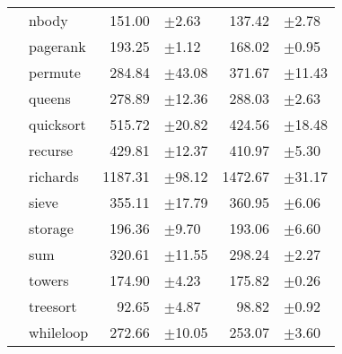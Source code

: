 \begin{tabular}{ll@{\hspace{6pt}}r@{\hspace{3pt}}l@{\hspace{6pt}}r@{\hspace{3pt}}l}
 & nbody & 151.00 & \scriptsize\textcolor{gray!60}{$\pm$2.63} & 137.42 & \scriptsize\textcolor{gray!60}{$\pm$2.78} \\
 & pagerank & 193.25 & \scriptsize\textcolor{gray!60}{$\pm$1.12} & 168.02 & \scriptsize\textcolor{gray!60}{$\pm$0.95} \\
 & permute & 284.84 & \scriptsize\textcolor{gray!60}{$\pm$43.08} & 371.67 & \scriptsize\textcolor{gray!60}{$\pm$11.43} \\
 & queens & 278.89 & \scriptsize\textcolor{gray!60}{$\pm$12.36} & 288.03 & \scriptsize\textcolor{gray!60}{$\pm$2.63} \\
 & quicksort & 515.72 & \scriptsize\textcolor{gray!60}{$\pm$20.82} & 424.56 & \scriptsize\textcolor{gray!60}{$\pm$18.48} \\
 & recurse & 429.81 & \scriptsize\textcolor{gray!60}{$\pm$12.37} & 410.97 & \scriptsize\textcolor{gray!60}{$\pm$5.30} \\
 & richards & 1187.31 & \scriptsize\textcolor{gray!60}{$\pm$98.12} & 1472.67 & \scriptsize\textcolor{gray!60}{$\pm$31.17} \\
 & sieve & 355.11 & \scriptsize\textcolor{gray!60}{$\pm$17.79} & 360.95 & \scriptsize\textcolor{gray!60}{$\pm$6.06} \\
 & storage & 196.36 & \scriptsize\textcolor{gray!60}{$\pm$9.70} & 193.06 & \scriptsize\textcolor{gray!60}{$\pm$6.60} \\
 & sum & 320.61 & \scriptsize\textcolor{gray!60}{$\pm$11.55} & 298.24 & \scriptsize\textcolor{gray!60}{$\pm$2.27} \\
 & towers & 174.90 & \scriptsize\textcolor{gray!60}{$\pm$4.23} & 175.82 & \scriptsize\textcolor{gray!60}{$\pm$0.26} \\
 & treesort & 92.65 & \scriptsize\textcolor{gray!60}{$\pm$4.87} & 98.82 & \scriptsize\textcolor{gray!60}{$\pm$0.92} \\
 & whileloop & 272.66 & \scriptsize\textcolor{gray!60}{$\pm$10.05} & 253.07 & \scriptsize\textcolor{gray!60}{$\pm$3.60} \\
\bottomrule
\end{tabular}